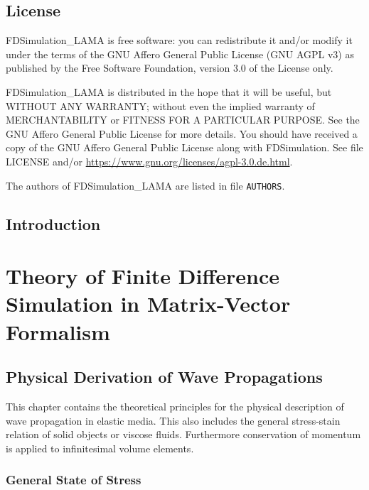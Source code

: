 \documentclass[pdftex,a4paper,parskip,listof=totoc,bibliography=totoc,onehalfspacing,12pt]{scrreprt}
\begin{document}
\setcounter{page}{1}

\cleardoublepage
\chapter*{License}

FDSimulation\_LAMA is free software: you can redistribute it and/or modify it under the terms of the GNU Affero General Public License (GNU AGPL v3) as published by the Free Software Foundation, version 3.0 of the License only.
 
FDSimulation\_LAMA is distributed in the hope that it will be useful, but WITHOUT ANY WARRANTY; without even the implied warranty of MERCHANTABILITY or FITNESS FOR A PARTICULAR PURPOSE. See the GNU Affero General Public License for more details. You should have received a copy of the GNU Affero General Public License along with FDSimulation. See file LICENSE and/or \url{https://www.gnu.org/licenses/agpl-3.0.de.html}.

The authors of FDSimulation\_LAMA are listed in file \lstinline{AUTHORS}.

\cleardoublepage
\chapter*{Introduction}




\cleardoublepage
\part{Theory of Finite Difference Simulation in Matrix-Vector Formalism}
\chapter{Physical Derivation of Wave Propagations}

This chapter contains the theoretical principles for the physical description of wave propagation in elastic media. This also includes the general stress-stain relation of solid objects or viscose fluids. Furthermore conservation of momentum is applied to infinitesimal volume elements.

\section{General State of Stress}
\label{kap:AllSp}
\end{document}
